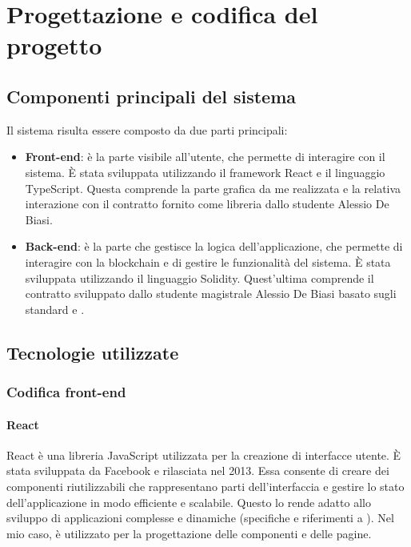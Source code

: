 \chapter{Progettazione e codifica del progetto}\label{cap:progettazione-codifica}


\section{Componenti principali del sistema}\label{sec:componenti-principali}
Il sistema risulta essere composto da due parti principali: 
\begin{itemize}
    \item{\textbf{Front-end}}: è la parte visibile all'utente, che permette di interagire con il sistema. È stata sviluppata utilizzando il framework React e il linguaggio TypeScript. 
    Questa comprende la parte grafica da me realizzata e la relativa interazione con il contratto fornito come libreria dallo studente Alessio De Biasi.
    \item {\textbf{Back-end}}: è la parte che gestisce la logica dell'applicazione, che permette di interagire con la blockchain e di gestire le funzionalità del sistema. È stata sviluppata utilizzando il linguaggio Solidity.
    Quest'ultima comprende il contratto sviluppato dallo studente magistrale Alessio De Biasi basato sugli standard   e .
\end{itemize}

\section{Tecnologie utilizzate}\label{sec:tecnologie-strumenti}

\subsection{Codifica front-end}

\subsubsection{React}
React è una libreria JavaScript utilizzata per la creazione di interfacce utente. È stata sviluppata da Facebook e rilasciata nel 2013. 
Essa consente di creare dei componenti riutilizzabili che rappresentano parti dell'interfaccia e gestire lo stato dell'applicazione in modo efficiente e scalabile.
Questo lo rende adatto allo sviluppo di applicazioni complesse e dinamiche (specifiche e riferimenti a \cite{site:react}).
Nel mio caso, è utilizzato per la progettazione delle componenti e delle pagine.

